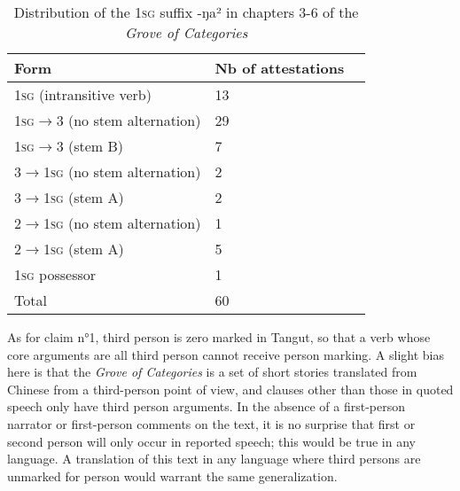 \documentclass[oldfontcommands,oneside,a4paper,11pt]{article}
\newcommand{\ipa}[1]{{\phon \mbox{#1}}} %
\newcommand{\zh}[1]{{\cn #1}}
\newcommand{\tgf}[1]{\begin{tabular}{l}\mo{#1}\\{\tiny #1}\end{tabular}}
\begin{document}
\begin{table}[H]
\caption{Distribution of the \textsc{1sg} suffix \ipa{-ŋa²} in chapters 3-6 of the \textit{Grove of Categories}} \label{tab:1sg} \centering
\begin{tabular}{lll}
\toprule
Form& Nb of attestations \\
\midrule
\textsc{1sg} (intransitive verb) & 	13 \\ 
\textsc{1sg}$\rightarrow$3  (no stem alternation) & 	29 \\ 
\textsc{1sg}$\rightarrow$3 (stem B)& 	7 \\ 
3$\rightarrow$\textsc{1sg} (no stem alternation) & 	2 \\ 
3$\rightarrow$\textsc{1sg} (stem A)& 	2 \\ 
2$\rightarrow$\textsc{1sg} (no stem alternation)& 	1 \\ 
2$\rightarrow$\textsc{1sg}  (stem A)& 	5 \\ 
\textsc{1sg} possessor & 	1 \\ 
\midrule
Total & 	60 \\ 
\bottomrule
\end{tabular}
\end{table}


As for claim n°1, third person is zero marked in Tangut, so that a verb whose core arguments are all third person cannot receive person marking. A slight bias here is that the \textit{Grove of Categories} is a set of short stories translated from Chinese from a third-person point of view, and clauses other than those in quoted speech only have third person arguments. In the absence of a first-person narrator or first-person comments on the text, it is no surprise that first or second person will only occur in reported speech; this would be true in any language. A translation of this text in any language where third persons are unmarked for person would warrant the same generalization.

 


\end{document}
